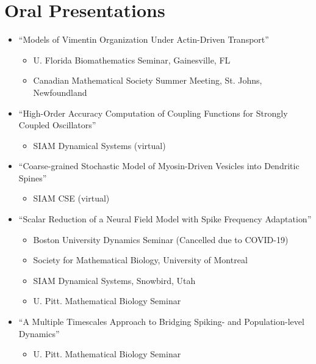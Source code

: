 \documentclass[a4paper,10pt]{article}
\begin{document}
\section{Oral Presentations}
\begin{itemize}[leftmargin=.225in,rightmargin=.1in]
    \item ``Models of Vimentin Organization Under Actin-Driven Transport''
    \begin{itemize}
        \item { U. Florida Biomathematics Seminar, Gainesville, FL}
        \item { Canadian Mathematical Society Summer Meeting, St. Johns, Newfoundland}
    \end{itemize}
    \item ``High-Order Accuracy Computation of Coupling Functions for Strongly Coupled Oscillators''
    \begin{itemize}
        \item { SIAM Dynamical Systems (virtual)}
    \end{itemize}
    \item ``Coarse-grained Stochastic Model of Myosin-Driven Vesicles into Dendritic Spines''
    \begin{itemize}
        \item { SIAM CSE (virtual)}
    \end{itemize}
    \item ``Scalar Reduction of a Neural Field Model with Spike Frequency Adaptation''
    \begin{itemize}
        \item { Boston University Dynamics Seminar (Cancelled due to COVID-19)}
        \item { Society for Mathematical Biology, University of Montreal}
        \item { SIAM Dynamical Systems, Snowbird, Utah}
        \item { U. Pitt. Mathematical Biology Seminar}
    \end{itemize}
    \item ``A Multiple Timescales Approach to Bridging Spiking- and Population-level Dynamics''
    \begin{itemize}
        \item { U. Pitt. Mathematical Biology Seminar}

\end{itemize}
\end{itemize}
\end{document}
